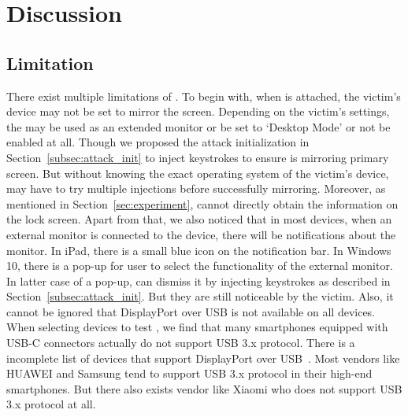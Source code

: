 \section{Discussion}
\label{sec:discussion}

\subsection{Limitation}
There exist multiple limitations of \tool. To begin with, when \tool is attached, the victim's device may not be set to mirror the screen. 
Depending on the victim's settings, the \tool may be used as an extended monitor or be set to `Desktop Mode' or not be enabled at all. Though we proposed the attack initialization in Section~\ref{subsec:attack_init} to inject keystrokes to ensure \tool is mirroring primary screen. But without knowing the exact operating system of the victim's device, \tool may have to try multiple injections before successfully mirroring.
Moreover, as mentioned in Section~\ref{sec:experiment}, \tool cannot directly obtain the information on the lock screen.
 Apart from that, we also noticed that in most devices, when an external monitor is connected to the device, there will be notifications about the monitor. In iPad, there is a small blue icon on the notification bar. In Windows 10, there is a pop-up for user to select the functionality of the external monitor. In latter case of a pop-up, \tool can dismiss it by injecting keystrokes as described in Section~\ref{subsec:attack_init}. But they are still noticeable by the victim. Also, it cannot be ignored that DisplayPort over \ac{USB} is not available on all devices. When selecting devices to test \tool, we find that many smartphones equipped with USB-C connectors actually do not support \ac{USB} 3.x protocol. There is a incomplete list of devices that support DisplayPort over \ac{USB}~\cite{usbclist}. Most vendors like HUAWEI and Samsung tend to support \ac{USB} 3.x protocol in their \mbox{high-end} smartphones. But there also exists vendor like Xiaomi who does not support \ac{USB} 3.x protocol at all. 

\begin{comment}
There exist multiple limitations of \tool.  To begin with, \tool can only gain
the information and control access of the host itself instead of external
hardware.  Consequently, as we introduced in the
Section~\ref{sec:countermeasures}, \tool can hardly bypass the defense
approaches that use external hardware for authorization.  Moreover, most of
the devices will prompt users to give authentication to the \ac{USB} devices or
select one of the functional modes after they are plugged in.  Though some of
such prompts are not conspicuous for non-experts, especially when \tool is
concealed within other functional hardware such as power banks \shuqing{If
there is experiment, add it here.}, the probability of whether users could get
aware that something unusual happens will increase with the existence of these
prompting messages.
\end{comment}
